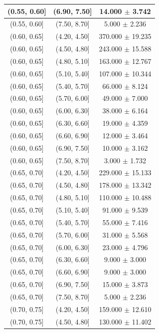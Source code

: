 \begin{longtable}{|c|c|c|}
\hline
(0.55, 0.60] & (6.90, 7.50] & 14.000 $\pm$ 3.742 \\ 
\hline
(0.55, 0.60] & (7.50, 8.70] & 5.000 $\pm$ 2.236 \\ 
\hline
(0.60, 0.65] & (4.20, 4.50] & 370.000 $\pm$ 19.235 \\ 
\hline
(0.60, 0.65] & (4.50, 4.80] & 243.000 $\pm$ 15.588 \\ 
\hline
(0.60, 0.65] & (4.80, 5.10] & 163.000 $\pm$ 12.767 \\ 
\hline
(0.60, 0.65] & (5.10, 5.40] & 107.000 $\pm$ 10.344 \\ 
\hline
(0.60, 0.65] & (5.40, 5.70] & 66.000 $\pm$ 8.124 \\ 
\hline
(0.60, 0.65] & (5.70, 6.00] & 49.000 $\pm$ 7.000 \\ 
\hline
(0.60, 0.65] & (6.00, 6.30] & 38.000 $\pm$ 6.164 \\ 
\hline
(0.60, 0.65] & (6.30, 6.60] & 19.000 $\pm$ 4.359 \\ 
\hline
(0.60, 0.65] & (6.60, 6.90] & 12.000 $\pm$ 3.464 \\ 
\hline
(0.60, 0.65] & (6.90, 7.50] & 10.000 $\pm$ 3.162 \\ 
\hline
(0.60, 0.65] & (7.50, 8.70] & 3.000 $\pm$ 1.732 \\ 
\hline
(0.65, 0.70] & (4.20, 4.50] & 229.000 $\pm$ 15.133 \\ 
\hline
(0.65, 0.70] & (4.50, 4.80] & 178.000 $\pm$ 13.342 \\ 
\hline
(0.65, 0.70] & (4.80, 5.10] & 110.000 $\pm$ 10.488 \\ 
\hline
(0.65, 0.70] & (5.10, 5.40] & 91.000 $\pm$ 9.539 \\ 
\hline
(0.65, 0.70] & (5.40, 5.70] & 55.000 $\pm$ 7.416 \\ 
\hline
(0.65, 0.70] & (5.70, 6.00] & 31.000 $\pm$ 5.568 \\ 
\hline
(0.65, 0.70] & (6.00, 6.30] & 23.000 $\pm$ 4.796 \\ 
\hline
(0.65, 0.70] & (6.30, 6.60] & 9.000 $\pm$ 3.000 \\ 
\hline
(0.65, 0.70] & (6.60, 6.90] & 9.000 $\pm$ 3.000 \\ 
\hline
(0.65, 0.70] & (6.90, 7.50] & 15.000 $\pm$ 3.873 \\ 
\hline
(0.65, 0.70] & (7.50, 8.70] & 5.000 $\pm$ 2.236 \\ 
\hline
(0.70, 0.75] & (4.20, 4.50] & 159.000 $\pm$ 12.610 \\ 
\hline
(0.70, 0.75] & (4.50, 4.80] & 130.000 $\pm$ 11.402 \\ 

\end{longtable}
